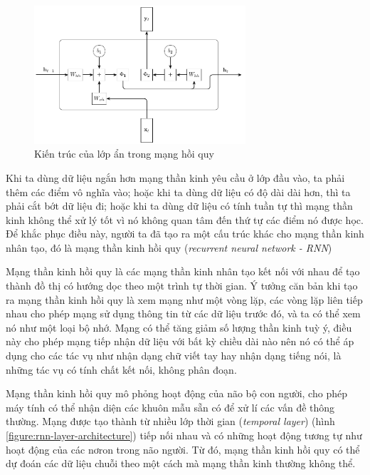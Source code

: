 \begin{figure}[htb]
    \centering
    \includegraphics[width=0.7\textwidth]{tikz_image/rnn_hidden_layer_architecture.pdf}
    \caption{Kiến trúc của lớp ẩn trong mạng hồi quy}
    \label{figure:rnn-hidden-layer-architecture}
\end{figure}

Khi ta dùng dữ liệu ngắn hơn mạng thần kinh yêu cầu ở lớp đầu vào, ta phải thêm các điểm vô nghĩa vào; hoặc khi ta dùng dữ liệu có độ dài dài hơn, thì ta phải cắt bớt dữ liệu đi; hoặc khi ta dùng dữ liệu có tính tuần tự thì mạng thần kinh không thể xử lý tốt vì nó không quan tâm đến thứ tự các điểm nó được học. Để khắc phục điều này, người ta đã tạo ra một cấu trúc khác cho mạng thần kinh nhân tạo, đó là mạng thần kinh hồi quy (\textit{recurrent neural network - RNN})

Mạng thần kinh hồi quy là các mạng thần kinh nhân tạo kết nối với nhau để tạo thành đồ thị có hướng dọc theo một trình tự thời gian. Ý tưởng căn bản khi tạo ra mạng thần kinh hồi quy là xem mạng như một vòng lặp, các vòng lặp liên tiếp nhau cho phép mạng sử dụng thông tin từ các dữ liệu trước đó, và ta có thể xem nó như một loại bộ nhớ. Mạng có thể tăng giảm số lượng thần kinh tuỳ ý, điều này cho phép mạng tiếp nhận dữ liệu với bất kỳ chiều dài nào nên nó có thể áp dụng cho các tác vụ như nhận dạng chữ viết tay hay nhận dạng tiếng nói, là những tác vụ có tính chất kết nối, không phân đoạn.

Mạng thần kinh hồi quy mô phỏng hoạt động của não bộ con người, cho phép máy tính có thể nhận diện các khuôn mẫu sẵn có để xử lí các vấn đề thông thường. Mạng được tạo thành từ nhiều lớp thời gian (\textit{temporal layer}) (hình \ref{figure:rnn-layer-architecture}) tiếp nối nhau và có những hoạt động tương tự như hoạt động của các nơron trong não người. Từ đó, mạng thần kinh hồi quy có thể dự đoán các dữ liệu chuỗi theo một cách mà mạng thần kinh thường không thể.

